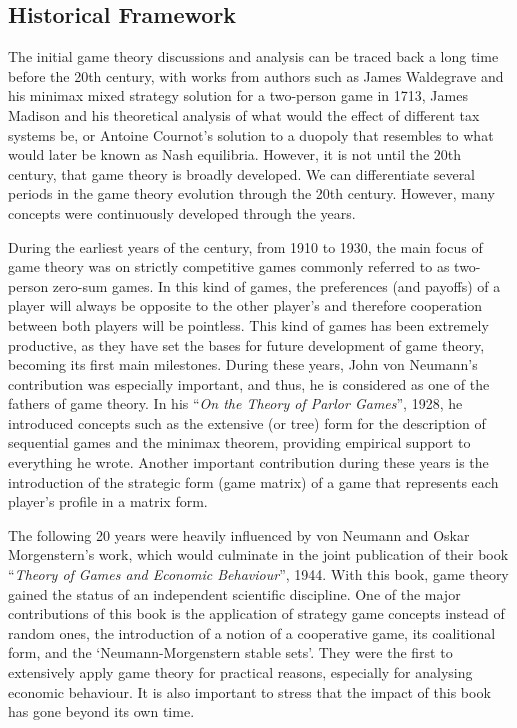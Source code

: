 \documentclass[]{report}
\begin{document}
	
\subsection{Historical Framework}

The initial game theory discussions and analysis can be traced back a long time before the 20th century, with works from authors such as James Waldegrave and his minimax mixed strategy solution for a two-person game in 1713, James Madison and his theoretical analysis of what would the effect of different tax systems be, or Antoine Cournot’s solution to a duopoly that resembles to what would later be known as Nash equilibria. However, it is not until the 20th century, that game theory is broadly developed. We can differentiate several periods in the game theory evolution through the 20th century. However, many concepts were continuously developed through the years.

During the earliest years of the century, from 1910 to 1930, the main focus of game theory was on  strictly competitive games commonly referred to as two-person zero-sum games. In this kind of games, the preferences (and payoffs) of a player will always be opposite to the other player’s and therefore cooperation between both players will be pointless. This kind of games has been extremely productive, as they have set the bases for future development of game theory, becoming its first main milestones. During these years, John von Neumann’s contribution was especially important, and thus, he is considered as one of the fathers of game theory.  In his “\textit{On the Theory of Parlor Games}”, 1928, he introduced concepts such as the extensive (or tree) form for the description of sequential games and the minimax theorem, providing empirical support to everything he wrote. Another important contribution during these years is the introduction of the strategic form (game matrix) of a game that represents each player’s profile in a matrix form.


The following 20 years were heavily influenced by von Neumann and Oskar Morgenstern’s work, which would culminate in the joint publication of their book “\textit{Theory of Games and Economic Behaviour}”, 1944.  With this book, game theory gained the status of an independent scientific discipline. One of the major contributions of this book is the application of strategy game concepts instead of random ones, the introduction of a notion of a cooperative game, its coalitional form, and the ‘Neumann-Morgenstern stable sets’. They were the first to extensively apply game theory for practical reasons, especially for analysing economic behaviour. It is also important to stress that the impact of this book has gone beyond its own time.  
\end{document}
